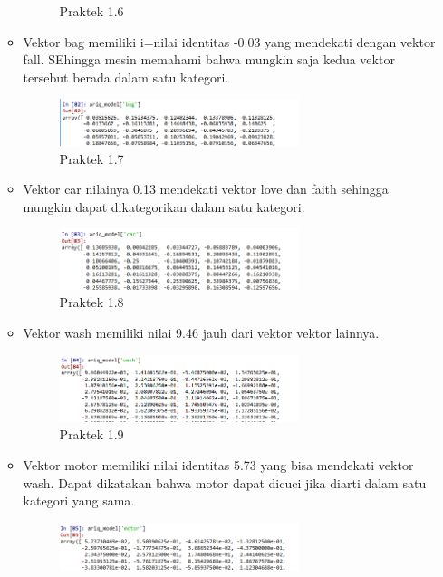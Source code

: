 \begin{enumerate}
\begin{itemize}
\begin{figure}[H]
			\centering
			\caption{Praktek 1.6}
		\end{figure}
		\item Vektor bag memiliki i=nilai identitas -0.03 yang mendekati dengan vektor fall. SEhingga mesin memahami bahwa mungkin saja kedua vektor tersebut berada dalam satu kategori.
		\hfill\break
		
		\begin{figure}[H]
			\includegraphics[width=7cm]{figures/1174087/5/14.png}
			\centering
			\caption{Praktek 1.7}
		\end{figure}
		\item Vektor car nilainya 0.13 mendekati vektor love dan faith sehingga mungkin dapat dikategorikan dalam satu kategori.
		\hfill\break
		
		\begin{figure}[H]
			\includegraphics[width=7cm]{figures/1174087/5/15.png}
			\centering
			\caption{Praktek 1.8}
		\end{figure}
		\item Vektor wash memiliki nilai 9.46 jauh dari vektor vektor lainnya.
		\hfill\break
		
		\begin{figure}[H]
			\includegraphics[width=7cm]{figures/1174087/5/16.png}
			\centering
			\caption{Praktek 1.9}
		\end{figure}
		\item Vektor motor memiliki nilai identitas 5.73 yang bisa mendekati vektor wash. Dapat dikatakan bahwa motor dapat dicuci jika diarti dalam satu kategori yang sama.
		\hfill\break
		
		\begin{figure}[H]
			\includegraphics[width=7cm]{figures/1174087/5/17.png}

\end{figure}
\end{itemize}
\end{enumerate}
